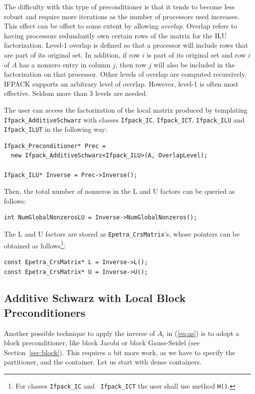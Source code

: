 The difficulty with this type of preconditioner is that it tends to become
less robust and require more iterations as the number of processors used
increases.  This effect can be offset to some extent by allowing {\em
overlap}.  Overlap refers to having processors redundantly own certain rows
of the matrix for the ILU factorization.  Level-1 overlap is defined so
that a processor will include rows that are part of its original set.  In
addition, if row $i$ is part of its original set and row $i$ of $A$ has a
nonzero entry in column $j$, then row $j$ will also be included in the
factorization on that processor.  Other levels of overlap are computed
recursively.  IFPACK supports an arbitrary level of overlap.  However,
level-1 is often most effective.  Seldom more than 3 levels are needed. 

\smallskip

The user can access the factorization of the local matrix produced by
templating \verb!Ifpack_AdditiveSchwarz! with classes \verb!Ifpack_IC!,
  \verb!Ifpack_ICT!, \verb!Ifpack_ILU! and \verb!Ifpack_ILUT! in the following
  way:
\begin{verbatim}
Ifpack_Preconditioner* Prec = 
  new Ifpack_AdditiveSchwarz<Ifpack_ILU>(A, OverlapLevel);

Ifpack_ILU* Inverse = Prec->Inverse();
\end{verbatim}
Then, the total number of nonzeros in the L and U factors can be queried as
follows:
\begin{verbatim}
int NumGlobalNonzerosLU = Inverse->NumGlobalNonzeros();
\end{verbatim}
The L and U factors are stored as \verb!Epetra_CrsMatrix!'s, whose pointers
can be obtained as follows\footnote{For classes {\tt Ifpack\_IC} and {\tt
  Ifpack\_ICT} the user shall use method {\tt H()}.}:
\begin{verbatim}
const Epetra_CrsMatrix* L = Inverse->L();
const Epetra_CrsMatrix* U = Inverse->U();
\end{verbatim}

\subsection{Additive Schwarz with Local Block Preconditioners}
\label{sec:as_b_ov}

Another possible technique to apply the inverse of $A_i$ in (\ref{eq:as})
is to adopt a block preconditioner, like block Jacobi 
or block Gauss-Seidel (see
Section~\ref{sec:block}). This requires a
bit more work, as we have to specify the partitioner, and the container. Let
us start with dense containers.


